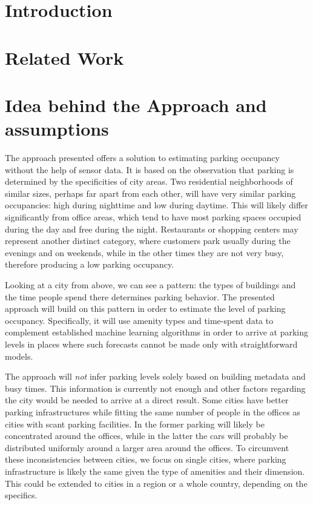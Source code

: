 \documentclass{article}
\begin{document}
	\section{Introduction}
	
	\section{Related Work}
	
	\section{Idea behind the Approach and assumptions}
	The approach presented offers a solution to estimating parking occupancy without the help of sensor data. It is based on the observation that parking is determined by the specificities of city areas. Two residential neighborhoods of similar sizes, perhaps far apart from each other, will have very similar parking occupancies: high during nighttime and low during daytime. This will likely differ significantly from office areas, which tend to have most parking spaces occupied during the day and free during the night. Restaurants or shopping centers may represent another distinct category, where customers park usually during the evenings and on weekends, while in the other times they are not very busy, therefore producing a low parking occupancy.
	
	Looking at a city from above, we can see a pattern: the types of buildings and the time people spend there determines parking behavior. The presented approach will build on this pattern in order to estimate the level of parking occupancy. Specifically, it will use amenity types and time-spent data to complement established machine learning algorithms in order to arrive at parking levels in places where such forecasts cannot be made only with straightforward models.
	
	The approach will \textit{not} infer parking levels solely based on building metadata and busy times. This information is currently not enough and other factors regarding the city would be needed to arrive at a direct result. Some cities have better parking infrastructures while fitting the same number of people in the offices as cities with scant parking facilities. In the former parking will likely be concentrated around the offices, while in the latter the cars will probably be distributed uniformly around a larger area around the offices. To circumvent these inconsistencies between cities, we focus on single cities, where parking infrastructure is likely the same given the type of amenities and their dimension. This could be extended to cities in a region or a whole country, depending on the specifics.
	
\end{document}
